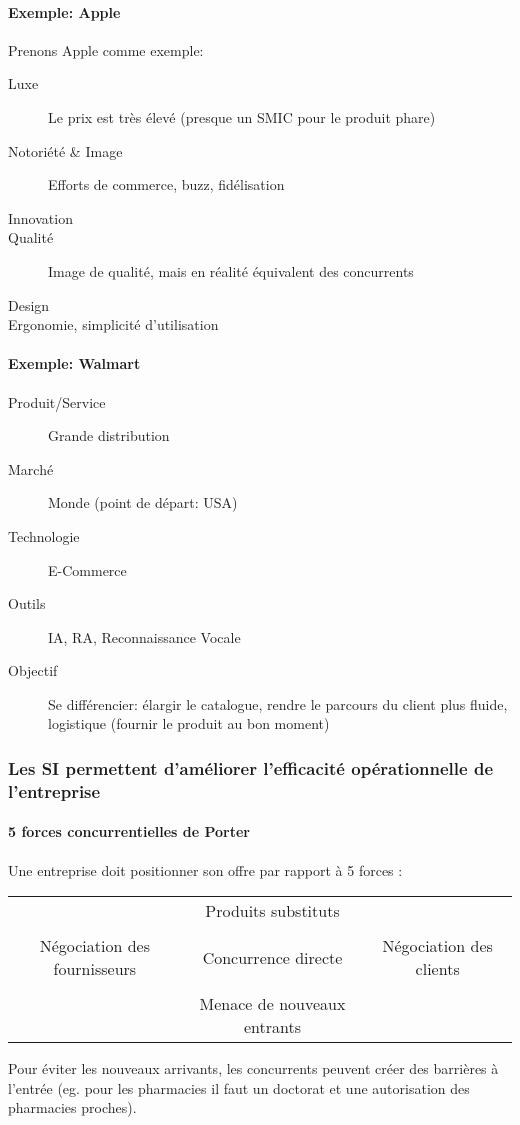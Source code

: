 \documentclass[10pt,a4paper,french]{article}
\begin{document}
\paragraph{Exemple: Apple}
Prenons Apple comme exemple:
\begin{description}
\item[Luxe] Le prix est très élevé (presque un SMIC pour le produit phare)
\item[Notoriété \& Image] Efforts de commerce, buzz, fidélisation
\item[Innovation]
\item[Qualité] Image de qualité, mais en réalité équivalent des concurrents
\item[Design]
\item[Ergonomie, simplicité d'utilisation]
\end{description}

\paragraph{Exemple: Walmart}
\begin{description}
\item[Produit/Service] Grande distribution
\item[Marché] Monde (point de départ: USA)
\item[Technologie] E-Commerce
\item[Outils] IA, RA, Reconnaissance Vocale
\item[Objectif] Se différencier: élargir le catalogue, rendre le parcours du client plus fluide, logistique (fournir le produit au bon moment)
\end{description}

\subsubsection{Les SI permettent d'améliorer l'efficacité opérationnelle de l'entreprise}

\paragraph{5 forces concurrentielles de Porter}
Une entreprise doit positionner son offre par rapport à 5 forces :
\begin{table}[h]
\centering
\begin{tabular}{ccc}
& Produits substituts & \\
\\
Négociation des fournisseurs & Concurrence directe & Négociation des clients \\
\\
& Menace de nouveaux entrants &
\end{tabular}
\end{table}
Pour éviter les nouveaux arrivants, les concurrents peuvent créer des barrières à l'entrée (eg. pour les pharmacies il faut un doctorat et une autorisation des pharmacies proches).
\end{document}
